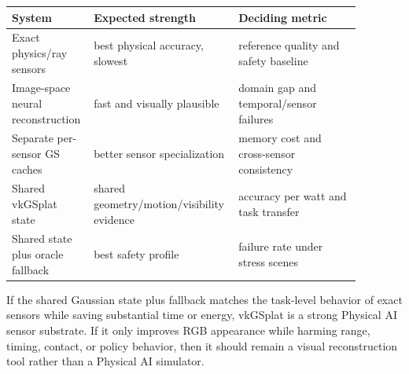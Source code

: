 \documentclass[11pt]{article}
\begin{document}
\begin{center}
\small
\begin{tabular}{p{0.22\linewidth}p{0.32\linewidth}p{0.34\linewidth}}
\toprule
System & Expected strength & Deciding metric \\
\midrule
Exact physics/ray sensors & best physical accuracy, slowest & reference quality and safety baseline \\
Image-space neural reconstruction & fast and visually plausible & domain gap and temporal/sensor failures \\
Separate per-sensor GS caches & better sensor specialization & memory cost and cross-sensor consistency \\
Shared vkGSplat state & shared geometry/motion/visibility evidence & accuracy per watt and task transfer \\
Shared state plus oracle fallback & best safety profile & failure rate under stress scenes \\
\bottomrule
\end{tabular}
\end{center}

If the shared Gaussian state plus fallback matches the task-level behavior of
exact sensors while saving substantial time or energy, vkGSplat is a strong
Physical AI sensor substrate. If it only improves RGB appearance while harming
range, timing, contact, or policy behavior, then it should remain a visual
reconstruction tool rather than a Physical AI simulator.
\end{document}
